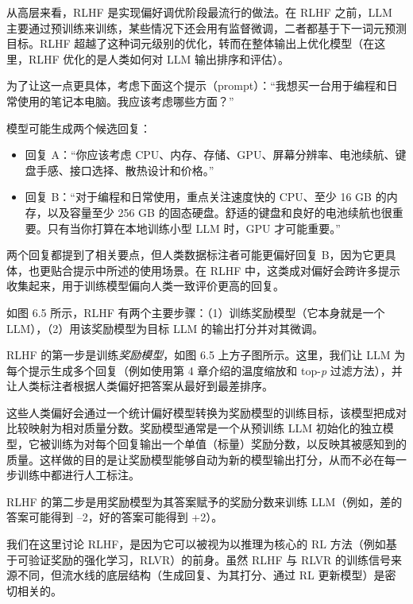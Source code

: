 从高层来看，RLHF 是实现偏好调优阶段最流行的做法。在 RLHF 之前，LLM 主要通过预训练来训练，某些情况下还会用有监督微调，二者都基于下一词元预测目标。RLHF 超越了这种词元级别的优化，转而在整体输出上优化模型（在这里，RLHF 优化的是人类如何对 LLM 输出排序和评估）。

为了让这一点更具体，考虑下面这个提示（prompt）：“我想买一台用于编程和日常使用的笔记本电脑。我应该考虑哪些方面？”

模型可能生成两个候选回复：

\begin{itemize}
\item 回复 A：“你应该考虑 CPU、内存、存储、GPU、屏幕分辨率、电池续航、键盘手感、接口选择、散热设计和价格。”
\item 回复 B：“对于编程和日常使用，重点关注速度快的 CPU、至少 16 GB 的内存，以及容量至少 256 GB 的固态硬盘。舒适的键盘和良好的电池续航也很重要。只有当你打算在本地训练小型 LLM 时，GPU 才可能重要。”
\end{itemize}

两个回复都提到了相关要点，但人类数据标注者可能更偏好回复 B，因为它更具体，也更贴合提示中所述的使用场景。在 RLHF 中，这类成对偏好会跨许多提示收集起来，用于训练模型偏向人类一致评价更高的回复。

如图 6.5 所示，RLHF 有两个主要步骤：（1）训练奖励模型（它本身就是一个 LLM），（2）用该奖励模型为目标 LLM 的输出打分并对其微调。


RLHF 的第一步是训练\emph{奖励模型}，如图 6.5 上方子图所示。这里，我们让 LLM 为每个提示生成多个回复（例如使用第 4 章介绍的温度缩放和 top-\emph{p} 过滤方法），并让人类标注者根据人类偏好把答案从最好到最差排序。

这些人类偏好会通过一个统计偏好模型转换为奖励模型的训练目标，该模型把成对比较映射为相对质量分数。奖励模型通常是一个从预训练 LLM 初始化的独立模型，它被训练为对每个回复输出一个单值（标量）奖励分数，以反映其被感知到的质量。这样做的目的是让奖励模型能够自动为新的模型输出打分，从而不必在每一步训练中都进行人工标注。

RLHF 的第二步是用奖励模型为其答案赋予的奖励分数来训练 LLM（例如，差的答案可能得到 –2，好的答案可能得到 +2）。

我们在这里讨论 RLHF，是因为它可以被视为以推理为核心的 RL 方法（例如基于可验证奖励的强化学习，RLVR）的前身。虽然 RLHF 与 RLVR 的训练信号来源不同，但流水线的底层结构（生成回复、为其打分、通过 RL 更新模型）是密切相关的。

